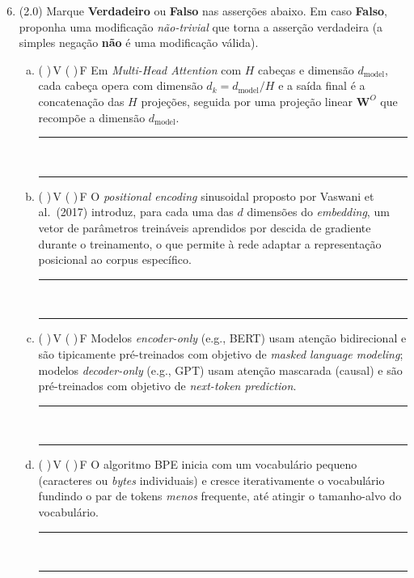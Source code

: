 \documentclass[11pt,a4paper]{article}
\begin{document}
\begin{enumerate}[1)]
\setcounter{enumi}{5}

\item (2.0) Marque \textbf{Verdadeiro} ou \textbf{Falso} nas asserções abaixo. Em caso \textbf{Falso}, proponha uma modificação \emph{não-trivial} que torna a asserção verdadeira (a simples negação \textbf{não} é uma modificação válida).

\begin{enumerate}[a)]
    \item ( )\,V \quad ( )\,F \quad Em \textit{Multi-Head Attention} com $H$ cabeças e dimensão $d_\text{model}$, cada cabeça opera com dimensão $d_k = d_\text{model}/H$ e a saída final é a concatenação das $H$ projeções, seguida por uma projeção linear $\mathbf{W}^O$ que recompõe a dimensão $d_\text{model}$.\\[0.2em]
    \rule{\linewidth}{0.4pt}\\[0.2em]
    \rule{\linewidth}{0.4pt}

    \item ( )\,V \quad ( )\,F \quad O \textit{positional encoding} sinusoidal proposto por Vaswani et al.\ (2017) introduz, para cada uma das $d$ dimensões do \textit{embedding}, um vetor de parâmetros treináveis aprendidos por descida de gradiente durante o treinamento, o que permite à rede adaptar a representação posicional ao corpus específico.\\[0.2em]
    \rule{\linewidth}{0.4pt}\\[0.2em]
    \rule{\linewidth}{0.4pt}

    \item ( )\,V \quad ( )\,F \quad Modelos \textit{encoder-only} (e.g., BERT) usam atenção bidirecional e são tipicamente pré-treinados com objetivo de \textit{masked language modeling}; modelos \textit{decoder-only} (e.g., GPT) usam atenção mascarada (causal) e são pré-treinados com objetivo de \textit{next-token prediction}.\\[0.2em]
    \rule{\linewidth}{0.4pt}\\[0.2em]
    \rule{\linewidth}{0.4pt}

    \item ( )\,V \quad ( )\,F \quad O algoritmo BPE inicia com um vocabulário pequeno (caracteres ou \textit{bytes} individuais) e cresce iterativamente o vocabulário fundindo o par de tokens \emph{menos} frequente, até atingir o tamanho-alvo do vocabulário.\\[0.2em]
    \rule{\linewidth}{0.4pt}\\[0.2em]
    \rule{\linewidth}{0.4pt}


\end{enumerate}
\end{enumerate}
\end{document}
